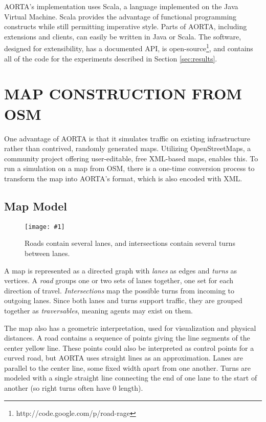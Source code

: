 \documentclass[letterpaper, 10 pt, conference]{ieeeconf}  %
\newcommand{\pix}[3]{
  \begin{figure}[h]
    \centering \texttt{[image: \#1]}
    \caption{#2}
  \end{figure}
}
\begin{document}
AORTA's implementation uses Scala, a language implemented on the Java Virtual
Machine. Scala provides the advantage of functional programming constructs while
still permitting imperative style. Parts of AORTA, including extensions and
clients, can easily be written in Java or Scala. The software, designed for
extensibility, has a documented API, is
open-source\footnote{http://code.google.com/p/road-rage}, and contains all of
the code for the experiments described in Section \ref{sec:results}.


\section{MAP CONSTRUCTION FROM OSM}
\label{sec:map}

One advantage of AORTA is that it simulates traffic on existing infrastructure
rather than contrived, randomly generated maps. Utilizing OpenStreetMaps, a
community project offering user-editable, free XML-based maps, enables this. To
run a simulation on a map from OSM, there is a one-time conversion process to
transform the map into AORTA's format, which is also encoded with XML.

\subsection{Map Model}

\pix{map_model.png}
    {Roads contain several lanes, and intersections contain several turns
     between lanes.}
    {scale=0.5}

A map is represented as a directed graph with \emph{lanes} as edges and
\emph{turns} as vertices. A \emph{road} groups one or two sets of lanes
together, one set for each direction of travel.
\emph{Intersections} map the possible turns from incoming to outgoing lanes.
Since both lanes and turns support traffic, they are grouped together as
\emph{traversables}, meaning agents may exist on them.

The map also has a geometric interpretation, used for visualization and physical
distances. A road contains a sequence of points giving the line segments of the
center yellow line. These points could also be interpreted as control points for
a curved road, but AORTA uses straight lines as an approximation. Lanes are
parallel to the center line, some fixed width apart from one another. Turns are
modeled with a single straight line connecting the end of one lane to the start
of another (so right turns often have $0$ length). 
\end{document}

